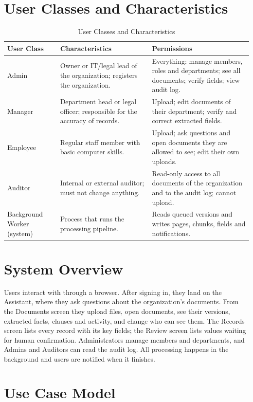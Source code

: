 \section{User Classes and Characteristics}
\begin{table}[H]\centering
\caption{User Classes and Characteristics}\label{tab:userclasses}
\begin{tabularx}{\textwidth}{|p{2.6cm}|X|X|}\hline
\textbf{User Class} & \textbf{Characteristics} & \textbf{Permissions} \\ \hline
Admin & Owner or IT/legal lead of the organization; registers the organization. &
Everything: manage members, roles and departments; see all documents; verify fields; view audit log. \\ \hline
Manager & Department head or legal officer; responsible for the accuracy of records. &
Upload; edit documents of their department; verify and correct extracted fields. \\ \hline
Employee & Regular staff member with basic computer skills. &
Upload; ask questions and open documents they are allowed to see; edit their own uploads. \\ \hline
Auditor & Internal or external auditor; must not change anything. &
Read-only access to all documents of the organization and to the audit log; cannot upload. \\ \hline
Background Worker (system) & Process that runs the processing pipeline. &
Reads queued versions and writes pages, chunks, fields and notifications. \\ \hline
\end{tabularx}
\end{table}

\section{System Overview}
Users interact with \sysname{} through a browser. After signing in, they land on the Assistant, where
they ask questions about the organization's documents. From the Documents screen they upload files,
open documents, see their versions, extracted facts, clauses and activity, and change who can see
them. The Records screen lists every record with its key fields; the Review screen lists values waiting
for human confirmation. Administrators manage members and departments, and Admins and Auditors can read
the audit log. All processing happens in the background and users are notified when it finishes.

\section{Use Case Model}
